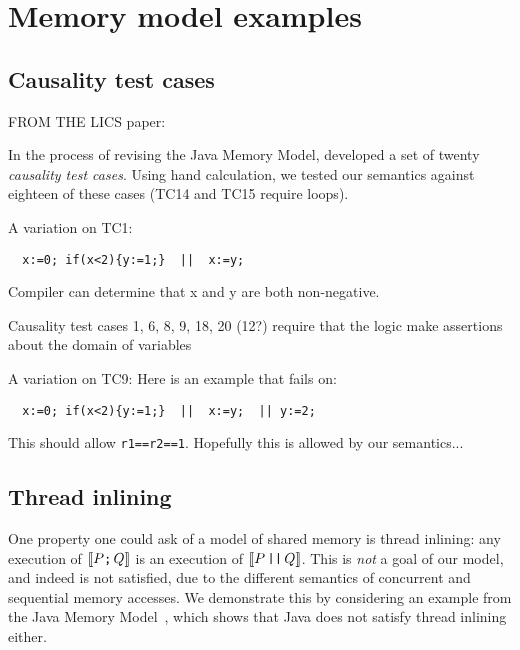 \section{Memory model examples}
\label{sec:appendix}


\subsection{Causality test cases}

FROM THE LICS paper:

In the process of revising the Java Memory Model, \citet{PughWebsite}
developed a set of twenty \emph{causality test cases}.  Using hand
calculation, we tested our semantics against eighteen of these cases (TC14
and TC15 require loops).


A variation on TC1:
\begin{verbatim}
  x:=0; if(x<2){y:=1;}  ||  x:=y;
\end{verbatim}
Compiler can determine that x and y are both non-negative.

Causality test cases 1, 6, 8, 9, 18, 20  (12?) require that the logic make
  assertions about the domain of variables

  A variation on TC9:
Here is an example that \cite{DBLP:conf/lics/JeffreyR16} fails on:
\begin{verbatim}
  x:=0; if(x<2){y:=1;}  ||  x:=y;  || y:=2;
\end{verbatim}
This should allow \texttt{r1==r2==1}.  Hopefully this is allowed by our
semantics...


\subsection{Thread inlining}

One property one could ask of a model of shared memory is thread
inlining: any execution of $\llbracket P\texttt{;}\, Q\rrbracket$ is an execution of $\llbracket P
  \,\texttt{||}\, Q\rrbracket$. This is \emph{not} a goal of our model, and indeed is not
satisfied, due to the different semantics of concurrent and sequential
memory accesses. We demonstrate this by considering an example from
the Java Memory Model~\cite{Manson:2005:JMM:1047659.1040336}, which shows that Java does not
satisfy thread inlining either.

